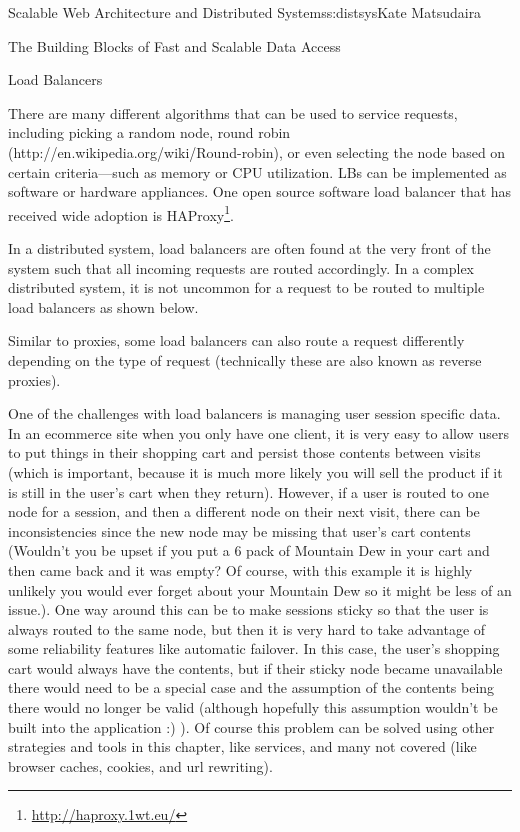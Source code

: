 \begin{aosachapter}{Scalable Web Architecture and Distributed Systems}{s:distsys}{Kate Matsudaira}
\begin{aosasect1}{The Building Blocks of Fast and Scalable Data Access}
\begin{aosasect2}{Load Balancers}

There are many different algorithms that can be used to service
requests, including picking a random node, round robin
(http://en.wikipedia.org/wiki/Round-robin), or even selecting the node
based on certain criteria---such as memory or CPU utilization. LBs can
be implemented as software or hardware appliances. One open source
software load balancer that has received wide adoption is
HAProxy\footnote{\url{http://haproxy.1wt.eu/}}.

In a distributed system, load balancers are often found at the very
front of the system such that all incoming requests are routed
accordingly. In a complex distributed system, it is not uncommon for a
request to be routed to multiple load balancers as shown below.


Similar to proxies, some load balancers can also route a request
differently depending on the type of request (technically these are
also known as reverse proxies).

One of the challenges with load balancers is managing user session
specific data. In an ecommerce site when you only have one client, it
is very easy to allow users to put things in their shopping cart and
persist those contents between visits (which is important, because it
is much more likely you will sell the product if it is still in the
user's cart when they return). However, if a user is routed to one
node for a session, and then a different node on their next visit,
there can be inconsistencies since the new node may be missing that
user's cart contents (Wouldn't you be upset if you put a 6 pack of
Mountain Dew in your cart and then came back and it was empty? Of
course, with this example it is highly unlikely you would ever forget
about your Mountain Dew so it might be less of an issue.). One way
around this can be to make sessions sticky so that the user is always
routed to the same node, but then it is very hard to take advantage of
some reliability features like automatic failover. In this case, the
user's shopping cart would always have the contents, but if their
sticky node became unavailable there would need to be a special case
and the assumption of the contents being there would no longer be
valid (although hopefully this assumption wouldn't be built into the
application :) ). Of course this problem can be solved using other
strategies and tools in this chapter, like services, and many not
covered (like browser caches, cookies, and url rewriting).


\end{aosasect2}
\end{aosasect1}
\end{aosachapter}
